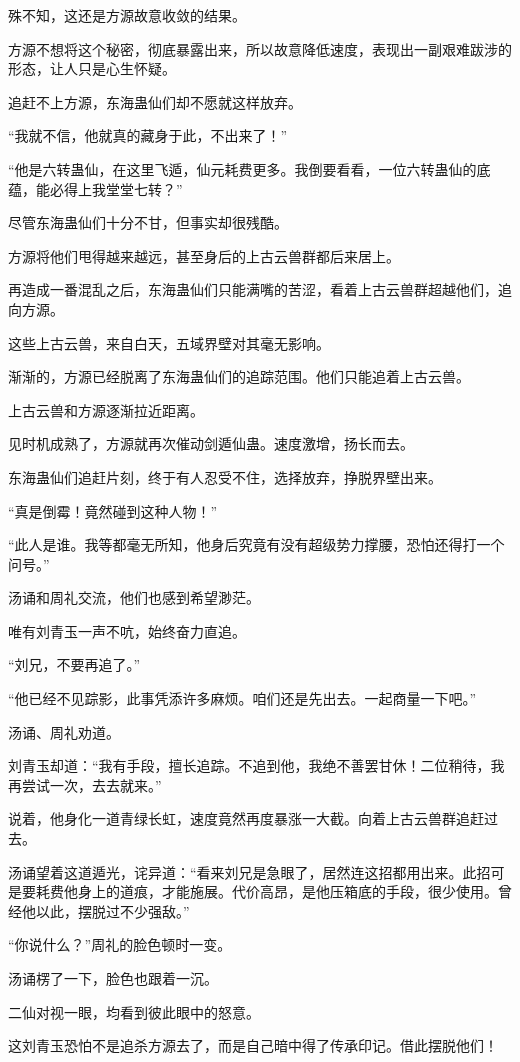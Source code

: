\begin{this_body}
殊不知，这还是方源故意收敛的结果。

方源不想将这个秘密，彻底暴露出来，所以故意降低速度，表现出一副艰难跋涉的形态，让人只是心生怀疑。

追赶不上方源，东海蛊仙们却不愿就这样放弃。

“我就不信，他就真的藏身于此，不出来了！”

“他是六转蛊仙，在这里飞遁，仙元耗费更多。我倒要看看，一位六转蛊仙的底蕴，能必得上我堂堂七转？”

尽管东海蛊仙们十分不甘，但事实却很残酷。

方源将他们甩得越来越远，甚至身后的上古云兽群都后来居上。

再造成一番混乱之后，东海蛊仙们只能满嘴的苦涩，看着上古云兽群超越他们，追向方源。

这些上古云兽，来自白天，五域界壁对其毫无影响。

渐渐的，方源已经脱离了东海蛊仙们的追踪范围。他们只能追着上古云兽。

上古云兽和方源逐渐拉近距离。

见时机成熟了，方源就再次催动剑遁仙蛊。速度激增，扬长而去。

东海蛊仙们追赶片刻，终于有人忍受不住，选择放弃，挣脱界壁出来。

“真是倒霉！竟然碰到这种人物！”

“此人是谁。我等都毫无所知，他身后究竟有没有超级势力撑腰，恐怕还得打一个问号。”

汤诵和周礼交流，他们也感到希望渺茫。

唯有刘青玉一声不吭，始终奋力直追。

“刘兄，不要再追了。”

“他已经不见踪影，此事凭添许多麻烦。咱们还是先出去。一起商量一下吧。”

汤诵、周礼劝道。

刘青玉却道：“我有手段，擅长追踪。不追到他，我绝不善罢甘休！二位稍待，我再尝试一次，去去就来。”

说着，他身化一道青绿长虹，速度竟然再度暴涨一大截。向着上古云兽群追赶过去。

汤诵望着这道遁光，诧异道：“看来刘兄是急眼了，居然连这招都用出来。此招可是要耗费他身上的道痕，才能施展。代价高昂，是他压箱底的手段，很少使用。曾经他以此，摆脱过不少强敌。”

“你说什么？”周礼的脸色顿时一变。

汤诵楞了一下，脸色也跟着一沉。

二仙对视一眼，均看到彼此眼中的怒意。

这刘青玉恐怕不是追杀方源去了，而是自己暗中得了传承印记。借此摆脱他们！


\end{this_body}
